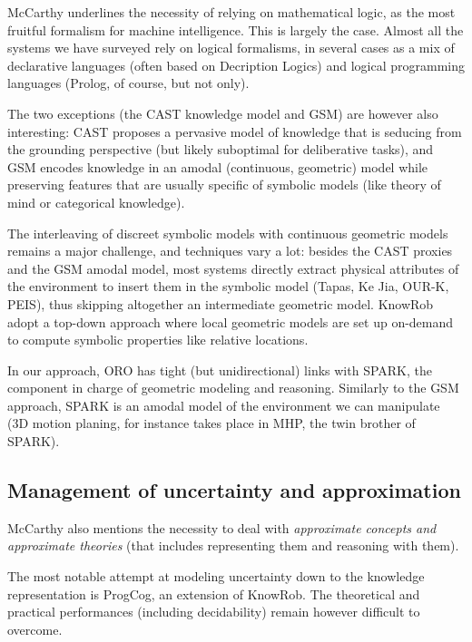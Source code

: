 McCarthy underlines the necessity of relying on mathematical logic, as the most
fruitful formalism for machine intelligence. This is largely the case. Almost
all the systems we have surveyed rely on logical formalisms, in several cases
as a mix of declarative languages (often based on Decription Logics) and
logical programming languages (Prolog, of course, but not only).

The two exceptions (the CAST knowledge model and GSM) are however also
interesting: CAST proposes a pervasive model of knowledge that is seducing from
the grounding perspective (but likely suboptimal for deliberative tasks), and
GSM encodes knowledge in an amodal (continuous, geometric) model while
preserving features that are usually specific of symbolic models (like theory
of mind or categorical knowledge).

The interleaving of discreet symbolic models with continuous geometric models
remains a major challenge, and techniques vary a lot: besides the CAST proxies
and the GSM amodal model, most systems directly extract physical attributes of
the environment to insert them in the symbolic model ({\sc Tapas}, Ke Jia,
OUR-K, PEIS), thus skipping altogether an intermediate geometric model. {\sc KnowRob}
adopt a top-down approach where local geometric models are set up on-demand to
compute symbolic properties like relative locations.

In our approach, ORO has tight (but unidirectional) links with SPARK, the
component in charge of geometric modeling and reasoning. Similarly to the GSM
approach, SPARK is an amodal model of the environment we can manipulate (3D
motion planing, for instance takes place in MHP, the twin brother of SPARK).

\subsection{Management of uncertainty and approximation}

McCarthy also mentions the necessity to deal with \emph{approximate concepts
and approximate theories} (that includes representing them and reasoning with
them).

The most notable attempt at modeling uncertainty down to the knowledge
representation is {\sc ProgCog}, an extension of {\sc KnowRob}. The theoretical
and practical performances (including decidability) remain however difficult to
overcome.

